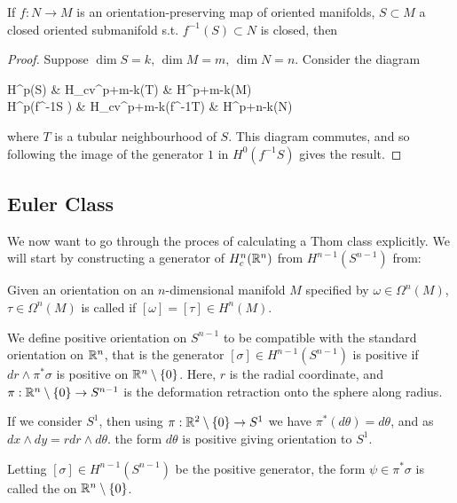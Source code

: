 \documentclass{article}
\begin{document}
\begin{prop}
	If $f:N \to M$ is an orientation-preserving map of oriented manifolds, $S \subset M$ a closed oriented submanifold s.t. $f^{-1}(S)\subset N$ is closed, then
\end{prop}
\begin{proof}
	Suppose $\dim S = k, \, \dim M = m, \, \dim N = n$. Consider the diagram 
	\begin{tkz}
		H^p(S) \arrow[r,"\mc{T}"] \arrow[d,"f^\ast"'] & H_{cv}^{p+m-k}(T) \arrow[r,"j_\ast"] \arrow[d,"f^\ast"'] & H^{p+m-k}(M) \arrow[d,"f^\ast"'] \\ 
		H^{p}(f^{-1}S ) \arrow[r,"\mc{T}"] & H_{cv}^{p+m-k}(f^{-1}T) \arrow[r,"j_\ast"] & H^{p+n-k}(N) 
	\end{tkz}
	where $T$ is a tubular neighbourhood of $S$. This diagram commutes, and so following the image of the generator $1$ in $H^0(f^{-1}S)$ gives the result. 
\end{proof}

\subsection{Euler Class}
We now want to go through the proces of calculating a Thom class explicitly. We will start by constructing a generator of $H_c^n(\mathbb{R}^n)$ from $H^{n-1}(S^{n-1})$ from: 
\begin{definition}
	Given an orientation on an $n$-dimensional manifold $M$ specified by $\omega \in \Omega^n(M)$, $\tau \in \Omega^n(M)$ is called  if $[\omega] = [\tau] \in H^n(M)$. 
\end{definition} 
We define positive orientation on $S^{n-1}$ to be compatible with the standard orientation on $\mathbb{R}^n$, that is the generator $[\sigma]\in H^{n-1}(S^{n-1})$ is positive if $dr \wedge \pi^\ast \sigma$ is positive on $\mathbb{R}^n\setminus\left\{ 0 \right\}$. Here, $r$ is the radial coordinate, and $\pi:\mathbb{R}^n \setminus \left\{ 0 \right\} \to S^{n-1}$ is the deformation retraction onto the sphere along radius. 

\begin{example}
	If we consider $S^1$, then using $\pi:\mathbb{R}^2\setminus\left\{ 0 \right\} \to S^1$ we have $\pi^\ast (d\theta) = d\theta$, and as $dx \wedge dy = rdr \wedge d\theta$. the form $d\theta$ is positive giving orientation to $S^1$.
\end{example}

\begin{definition}
	Letting $[\sigma]\in H^{n-1}(S^{n-1})$ be the positive generator, the form $\psi \in \pi^\ast \sigma$ is called the  on $\mathbb{R}^n \setminus \left\{ 0 \right\}$.
\end{definition}
\end{document}
